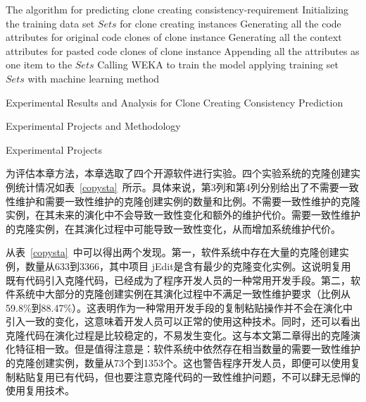 \begin{minipage}{0.8\textwidth}
\centering
\begin{algorithm}[H]
 {The algorithm for predicting clone creating consistency-requirement}
\label{alg-collectionperdition}
Initializing the training data set $Sets$ for clone creating instances\; 
{ 
Generating all the code attributes for original code clones of clone instance\;
Generating all the context attributes for pasted code clones of clone instance\;
Appending all the attributes as one item to the $Sets$\;
}
Calling WEKA to train the model applying training set $Sets$ with machine learning method\;
\end{algorithm}
\end{minipage}

{Experimental Results and Analysis  for Clone Creating Consistency Prediction}


{Experimental Projects and Methodology}

{Experimental Projects}

为评估本章方法，本章选取了四个开源软件进行实验。四个实验系统的克隆创建实例统计情况如表~\ref{copysta}~所示。具体来说，第3列和第4列分别给出了不需要一致性维护和需要一致性维护的克隆创建实例的数量和比例。不需要一致性维护的克隆实例，在其未来的演化中不会导致一致性变化和额外的维护代价。需要一致性维护的克隆实例，在其演化过程中可能导致一致性变化，从而增加系统维护代价。

从表~\ref{copysta}~中可以得出两个发现。第一，软件系统中存在大量的克隆创建实例，数量从633到3366，其中项目 jEdit是含有最少的克隆变化实例。这说明复用既有代码引入克隆代码，已经成为了程序开发人员的一种常用开发手段。第二，软件系统中大部分的克隆创建实例在其演化过程中不满足一致性维护要求（比例从59.8\%到88.47\%）。这表明作为一种常用开发手段的复制粘贴操作并不会在演化中引入一致的变化，这意味着开发人员可以正常的使用这种技术。同时，还可以看出克隆代码在演化过程是比较稳定的，不易发生变化。这与本文第二章得出的克隆演化特征相一致。但是值得注意是：软件系统中依然存在相当数量的需要一致性维护的克隆创建实例，数量从73个到1353个。这也警告程序开发人员，即便可以使用复制粘贴复用已有代码，但也要注意克隆代码的一致性维护问题，不可以肆无忌惮的使用复用技术。

